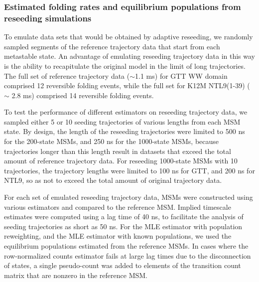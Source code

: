 \documentclass[%
 aip,
rsi,%
 amsmath,amssymb,
 reprint,%
]{revtex4-1}
\begin{document}
\subsubsection*{Estimated folding rates and equilibrium populations from reseeding simulations}

To emulate data sets that would be obtained by adaptive reseeding, we randomly sampled segments of the reference trajectory data that start from each metastable state.  An advantage of emulating reseeding trajectory data in this way is the ability to recapitulate the original model in the limit of long trajectories. The full set of reference trajectory data ($\sim$1.1 ms) for GTT WW domain comprised 12 reversible folding events, while the full set for K12M NTL9(1-39) ($\sim$ 2.8 ms) comprised 14 reversible folding events. 

To test the performance of different estimators on reseeding trajectory data, we sampled either 5 or 10 seeding trajectories of various lengths from each MSM state.  By design, the length of the reseeding trajectories were limited to 500 ns for the 200-state MSMs, and 250 ns for the 1000-state MSMs, because trajectories longer than this length result in datasets that exceed the total amount of reference trajectory data.  For reseeding 1000-state MSMs with 10 trajectories, the trajectory lengths were limited to 100 ns for GTT, and 200 ns for NTL9, so as not to exceed the total amount of original trajectory data.

For each set of emulated reseeding trajectory data, MSMs were constructed using various estimators and compared to the reference MSM. Implied timescale estimates were computed using a lag time of 40 ns, to facilitate the analysis of seeding trajectories as short as 50 ns. For the MLE estimator with population reweighting, and the MLE estimator with known populations, we used the equilibrium populations estimated from the reference MSMs.  In cases where the row-normalized counts estimator fails at large lag times due to the disconnection of states, a single pseudo-count was added to elements of the transition count matrix that are nonzero in the reference MSM.

\end{document}

